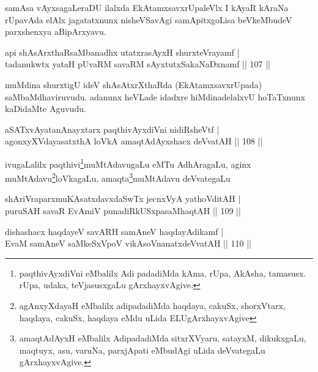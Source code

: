 \begin{artha}
samAsa vAyxsagaLeraDU ilalxda EkAtamxsavxrUpaleVlx I kAyaR kAraNa rUpavAda elAlx jagatatxnunx nisheVSavAgi samApitxgoLisa beVkeMbudeV parxshenxya aBipArxyavu.
\end{artha}

\begin{shl}
api shAsArxthaRsaMbanadhx utatxrasAyxH shurxteVrayamf |\\
tadanukwtx yataH pUvaRM savaRM sAyxtutxSakaNaDxnamf \hfill || 107 ||
\end{shl}

\begin{artha}
muMdina shurxtigU ideV shAsAtxrXthaRda (EkAtamxsavxrUpada) saMbaMdhaviruvudu. adanunx heVLade idadxre hiMdinadelalxvU hoTaTxnunx kaDidaMte Aguvudu.
\end{artha}


\begin{shl}
aSATxvAyatanAnayxtarx paqthivAyxdiVni nidiRsheVtf |\\
agonxyXVdayasatxthA loVkA amaqtAdAyxshacx deVvatAH \hfill || 108 ||
\end{shl}

\begin{artha}
ivugaLalilx paqthivi\footnote[1]{paqthivAyxdiVni eMbalilx Adi padadiMda kAma, rUpa, AkAsha, tamasusx. rUpa, udaka, teVjasusxgaLu gArxhayxvAgive.}muMtAdavugaLu eMTu AdhAragaLu, aginx muMtAdavu\footnote[2]{agAnxyXdayaH eMbalilx adipadadiMda haqdaya, cakuSx, shorxVtarx, haqdaya, cakuSx, haqdaya eMdu uLida ELUgArxhayxvAgive}loVkagaLu, amaqta\footnote[3]{amaqtAdAyxH eMbalilx AdipadadiMda sitxrXVyaru, satayxM, dikukxgaLu, maqtuyx, asu, varuNa, parxjApati eMbudAgi uLida deVvategaLu gArxhayxvAgive.}muMtAdavu deVvategaLu 
\end{artha}

\begin{shl}
shAriVraparxmuKAsatxdavxdaSwTx jecnxVyA yathoVditAH |\\
puruSAH savaR EvAmiV punadiRkUSxpasaMhaqtAH \hfill || 109 ||
\end{shl}

\begin{shl}
dishashacx haqdayeV savARH samAneV haqdayAdikamf |\\
EvaM samAneV saMkeSxVpoV vikAsoV\s nanatxdeVvatAH \hfill || 110 ||
\end{shl}

